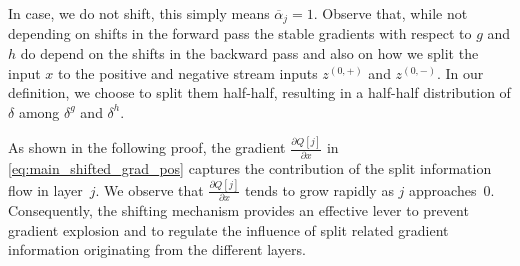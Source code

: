 In case, we do not shift, this simply means $\overline{\alpha}_j = 1$.
Observe that, while not depending on shifts in the forward pass the stable gradients with respect to $g$ and $h$ do depend on the shifts in the backward pass and also on how we split the input $x$ to the positive and negative stream inputs $z^{(0,+)}$ and $z^{(0,-)}$.
In our definition, we choose to split them half-half, resulting in a half-half distribution of $\delta$ among $\delta^g$ and $\delta^h$.

\begin{remark}[Shifting]
    As shown in the following proof, 
    the gradient $\frac{\partial Q[j]}{\partial x}$ in \cref{eq:main_shifted_grad_pos} 
    captures the contribution of the split information flow in layer~$j$.
    We observe that $\frac{\partial Q[j]}{\partial x}$ tends to grow rapidly as $j$ approaches~$0$.
    Consequently, the shifting mechanism provides an effective lever to prevent gradient explosion 
    and to regulate the influence of split related gradient information originating from the different layers.
\end{remark}


